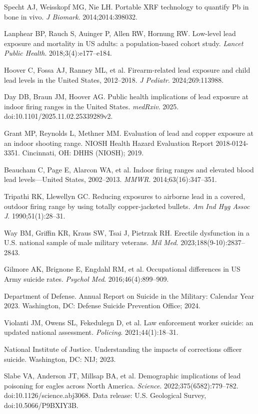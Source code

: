 \documentclass[11pt,twocolumn]{article}
\begin{document}
{\begin{enumerate}[label={[\arabic*]}, leftmargin=*, itemsep=1pt]
    \item Specht AJ, Weisskopf MG, Nie LH. Portable XRF technology to quantify Pb in bone in vivo. \textit{J Biomark}. 2014;2014:398032.
    \item Lanphear BP, Rauch S, Auinger P, Allen RW, Hornung RW. Low-level lead exposure and mortality in US adults: a population-based cohort study. \textit{Lancet Public Health}. 2018;3(4):e177--e184.
    \item Hoover C, Fossa AJ, Ranney ML, et al. Firearm-related lead exposure and child lead levels in the United States, 2012--2018. \textit{J Pediatr}. 2024;269:113988.
    \item Day DB, Braun JM, Hoover AG. Public health implications of lead exposure at indoor firing ranges in the United States. \textit{medRxiv}. 2025. doi:10.1101/2025.11.02.25339289v2.
    \item Grant MP, Reynolds L, Methner MM. Evaluation of lead and copper exposure at an indoor shooting range. NIOSH Health Hazard Evaluation Report 2018-0124-3351. Cincinnati, OH: DHHS (NIOSH); 2019.
    \item Beaucham C, Page E, Alarcon WA, et al. Indoor firing ranges and elevated blood lead levels---United States, 2002--2013. \textit{MMWR}. 2014;63(16):347--351.
    \item Tripathi RK, Llewellyn GC. Reducing exposures to airborne lead in a covered, outdoor firing range by using totally copper-jacketed bullets. \textit{Am Ind Hyg Assoc J}. 1990;51(1):28--31.
    \item Way BM, Griffin KR, Kraus SW, Tsai J, Pietrzak RH. Erectile dysfunction in a U.S. national sample of male military veterans. \textit{Mil Med}. 2023;188(9-10):2837--2843.
    \item Gilmore AK, Brignone E, Engdahl RM, et al. Occupational differences in US Army suicide rates. \textit{Psychol Med}. 2016;46(4):899--909.
    \item Department of Defense. Annual Report on Suicide in the Military: Calendar Year 2023. Washington, DC: Defense Suicide Prevention Office; 2024.
    \item Violanti JM, Owens SL, Fekedulegn D, et al. Law enforcement worker suicide: an updated national assessment. \textit{Policing}. 2021;44(1):18--31.
    \item National Institute of Justice. Understanding the impacts of corrections officer suicide. Washington, DC: NIJ; 2023.
    \item Slabe VA, Anderson JT, Millsap BA, et al. Demographic implications of lead poisoning for eagles across North America. \textit{Science}. 2022;375(6582):779--782. doi:10.1126/science.abj3068. Data release: U.S. Geological Survey, doi:10.5066/P9BXIY3B.
\end{enumerate}
}
\end{document}
